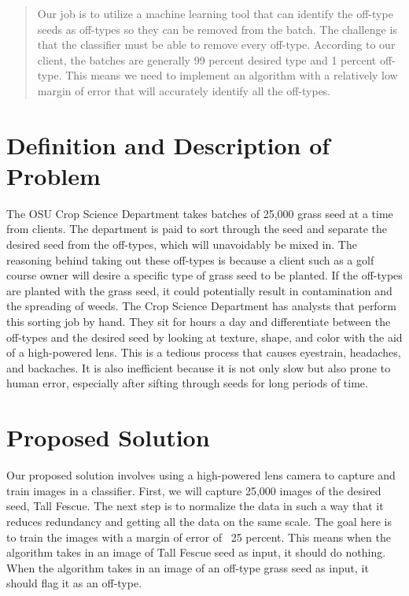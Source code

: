 \documentclass[onecolumn, draftclsnofoot,10pt, compsoc]{IEEEtran}
\begin{document}
\begin{titlepage}
\begin{singlespace}
\begin{abstract}
Our job is to utilize a machine learning tool that can identify the off-type seeds as off-types so they can be removed from the batch. The challenge is that the classifier must be able to remove every off-type. According to our client, the batches are generally 99 percent desired type and 1 percent off-type. This means we need to implement an algorithm with a relatively low margin of error that will accurately identify all the off-types.


        \end{abstract}     
    \end{singlespace}
\end{titlepage}
\newpage
{}
\tableofcontents
\clearpage

\section{Definition and Description of Problem}
The OSU Crop Science Department takes batches of 25,000 grass seed at a time from clients. The department is paid to sort through the seed and separate the desired seed from the off-types, which will unavoidably be mixed in. The reasoning behind taking out these off-types is because a client such as a golf course owner will desire a specific type of grass seed to be planted. If the off-types are planted with the grass seed, it could potentially result in contamination and the spreading of weeds. 
The Crop Science Department has analysts that perform this sorting job by hand. They sit for hours a day and differentiate between the off-types and the desired seed by looking at texture, shape, and color with the aid of a high-powered lens. This is a tedious process that causes eyestrain, headaches, and backaches. It is also inefficient because it is not only slow but also prone to human error, especially after sifting through seeds for long periods of time. 

\section{Proposed Solution}
Our proposed solution involves using a high-powered lens camera to capture and train images in a classifier. First, we will capture 25,000 images of the desired seed, Tall Fescue. The next step is to normalize the data in such a way that it reduces redundancy and getting all the data on the same scale. The goal here is to train the images with a margin of error of ~25 percent. This means when the algorithm takes in an image of Tall Fescue seed as input, it should do nothing. When the algorithm takes in an image of an off-type grass seed as input, it should flag it as an off-type. 
\end{document}
